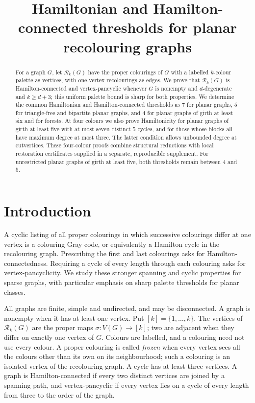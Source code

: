 \documentclass[11pt]{article}
\title{Hamiltonian and Hamilton-connected thresholds for planar recolouring graphs}
\author{}
\date{}
\theoremstyle{remark}
\newcommand{\Rk}{\mathcal R_k}
\numberwithin{equation}{section}
\numberwithin{table}{section}
\begin{document}
\maketitle

\begin{abstract}
For a graph $G$, let $\Rk(G)$ have the proper colourings of $G$ with a
labelled $k$-colour palette as vertices, with one-vertex recolourings as
edges. We prove that $\Rk(G)$ is Hamilton-connected and vertex-pancyclic
whenever $G$ is nonempty and $d$-degenerate and $k\ge d+3$; this uniform
palette bound is sharp for both properties. We determine the common
Hamiltonian and Hamilton-connected thresholds as $7$ for planar graphs,
$5$ for triangle-free and bipartite planar graphs, and $4$ for planar
graphs of girth at least six and for forests. At four colours we also
prove Hamiltonicity for planar graphs of girth at least five with at
most seven distinct $5$-cycles, and for those whose blocks all have
maximum degree at most three. The latter condition allows unbounded
degree at cutvertices. These four-colour proofs combine structural
reductions with local restoration certificates supplied in a separate,
reproducible supplement. For unrestricted planar graphs of girth at
least five, both thresholds remain between $4$ and $5$.
\end{abstract}

\section{Introduction}

A cyclic listing of all proper colourings in which successive colourings
differ at one vertex is a colouring Gray code, or equivalently a Hamilton
cycle in the recolouring graph. Prescribing the first and last
colourings asks for Hamilton-connectedness. Requiring a cycle of every
length through each colouring asks for vertex-pancyclicity. We study
these stronger spanning and cyclic properties for sparse graphs, with
particular emphasis on sharp palette thresholds for planar classes.

All graphs are finite, simple and undirected, and may be disconnected.
A graph is nonempty when it has at least one vertex. Put $[k]=\{1,\ldots,k\}$.
The vertices of $\Rk(G)$ are the proper maps $\sigma:V(G)\to[k]$;
two are adjacent when they differ on exactly one vertex of $G$.
Colours are labelled, and a colouring need not use every colour.
A proper colouring is called \emph{frozen} when every vertex sees all
the colours other than its own on its neighbourhood; such a colouring
is an isolated vertex of the recolouring graph.
A cycle has at least three vertices. A graph is Hamilton-connected if
every two distinct vertices are joined by a spanning path, and
vertex-pancyclic if every vertex lies on a cycle of every length from
three to the order of the graph.
\end{document}
